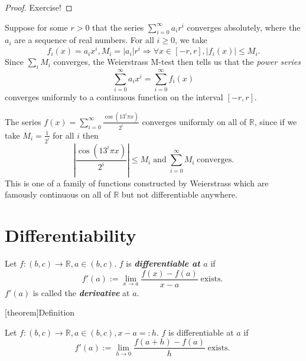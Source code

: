 \documentclass[12pt]{report}
\theoremstyle{definition}
\begin{document}
\begin{proof}
    Exercise!
\end{proof} 

\begin{ex}
    Suppose for some $r>0$ that the series $\sum_{i=0}^{\infty} a_i r^{i}$
    converges absolutely, where the $a_i$ are a sequence of real numbers.
    For all $i\ge 0$, we take \[
        f_i(x) = a_i x^{i}, M_i = |a_i|r^{i} \Longrightarrow
        \forall x\in[-r,r], |f_i(x)|\le M_i.
    \]
    Since $\sum_{i}^{} M_i$ converges, the Weierstrass M-test then tells us that
    the \emph{power series} \[
        \sum_{i=0}^{\infty} a_i x^{i} = \sum_{i=0}^{\infty} f_i(x)
    \]converges uniformly to a continuous function on the interval $[-r,r]$.
\end{ex} 

\begin{ex}
    The series $f(x)=\sum_{i=0}^{\infty} \frac{\cos{(13^{i}\pi x)}}{2^{i}}$
    converges uniformly on all of $\mathbb{R}$,
    since if we take $M_i = \frac{1}{2^{i}}$ for all $i$ then\[
        \left|\frac{\cos{(13^{i}\pi x)}}{2^{i}}\right|\le M_i
        \;\text{and}\; \sum_{i=0}^{\infty} M_i \;\text{converges.}
    \]
    This is one of a family of functions constructed by Weierstrass which
    are famously continuous on all of $\mathbb{R}$ but not differentiable
    anywhere.
\end{ex} 



\section{Differentiability}

\begin{differentiable}
    Let $f:(b,c) \rightarrow{} \mathbb{R}, a \in (b,c)$.
    $f$ is \textbf{\emph{differentiable at $a$}} if\[
        f'(a) := \lim_{x\rightarrow{}a} \frac{f(x) - f(a)}{x - a} \;\text{exists.}\;
    \]$f'(a)$ is called the \textbf{\emph{derivative}} at $a$.
\end{differentiable}

[theorem]{Definition}
\begin{differentiable alternative def}
    Let $f:(b,c) \rightarrow{} \mathbb{R}, a \in (b,c), x - a =: h$.
    $f$ is differentiable at $a$ if\[
        f'(a) := \lim_{h\rightarrow{}0} \frac{f(a + h) - f(a)}{h} \;\text{exists.}\;
    \]
\end{differentiable alternative def}
\end{document}
